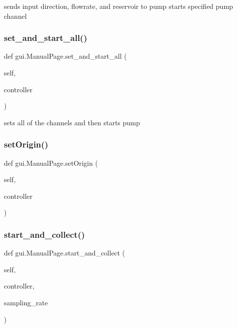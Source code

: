 \begin{DoxyVerb}sends input direction, flowrate, and reservoir to pump
starts specified pump channel
\end{DoxyVerb}
 \mbox{\label{classgui_1_1_manual_page_aafb53b0cbb634487b3b8c92f86e2ec84}} 
\subsubsection{\texorpdfstring{set\_and\_start\_all()}{set\_and\_start\_all()}}
{\footnotesize\ttfamily def gui.\+Manual\+Page.\+set\+\_\+and\+\_\+start\+\_\+all (\begin{DoxyParamCaption}\item[{}]{self,  }\item[{}]{controller }\end{DoxyParamCaption})}

\begin{DoxyVerb}sets all of the channels and then starts pump
\end{DoxyVerb}
 \mbox{\label{classgui_1_1_manual_page_a44e1acd86d45652102beaa175029d19c}} 
\subsubsection{\texorpdfstring{setOrigin()}{setOrigin()}}
{\footnotesize\ttfamily def gui.\+Manual\+Page.\+set\+Origin (\begin{DoxyParamCaption}\item[{}]{self,  }\item[{}]{controller }\end{DoxyParamCaption})}

\mbox{\label{classgui_1_1_manual_page_a84aad97721801aac938836ad9df5ac11}} 
\subsubsection{\texorpdfstring{start\_and\_collect()}{start\_and\_collect()}}
{\footnotesize\ttfamily def gui.\+Manual\+Page.\+start\+\_\+and\+\_\+collect (\begin{DoxyParamCaption}\item[{}]{self,  }\item[{}]{controller,  }\item[{}]{sampling\+\_\+rate }\end{DoxyParamCaption})}

